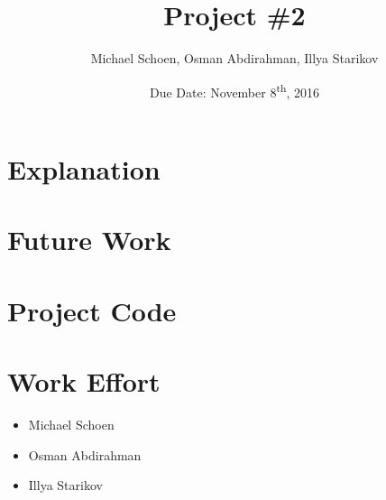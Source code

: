 \documentclass[12pt]{article}
\title{Project \#2}
\date{Due Date: November 8\textsuperscript{th}, 2016}
\author{Michael Schoen, Osman Abdirahman, Illya Starikov}
\begin{document}
\maketitle

\section{Explanation}
\section{Future Work}
\section{Project Code}
\section{Work Effort}
\begin{itemize}
    \item Michael Schoen
    \item Osman Abdirahman
    \item Illya Starikov
\end{itemize}
\end{document}
